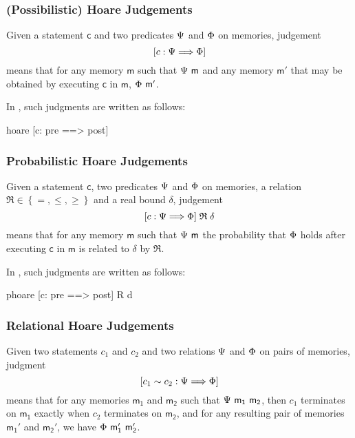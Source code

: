 
\subsubsection*{(Possibilistic) Hoare Judgements}
Given a statement $\mathsf{c}$ and two predicates $\Psi$ and $\Phi$ on
memories, judgement \[\left[{c}:{\Psi}\Longrightarrow{\Phi}\right]\] means that for any memory
$\mathsf{m}$ such that $\Psi\ \mathsf{m}$ and any memory $\mathsf{m'}$ that may
be obtained by executing $\mathsf{c}$ in $\mathsf{m}$, $\Phi\ \mathsf{m'}$.

In \EasyCrypt, such judgments are written as follows:
\begin{easycrypt}[frame=none]{}
hoare [c: pre ==> post]
\end{easycrypt}

\subsubsection*{Probabilistic Hoare Judgements}
Given a statement $\mathsf{c}$, two predicates $\Psi$ and $\Phi$ on
memories, a relation $\mathfrak{R} \in \left\{=,\leq,\geq\right\}$ and a real bound $\delta$,
judgement \[\left[{c}:{\Psi}\Longrightarrow{\Phi}\right] \mathrel{\mathfrak{R}} \delta\] means that for
any memory $\mathsf{m}$ such that $\Psi\ \mathsf{m}$ the probability that
$\Phi$ holds after executing $\mathsf{c}$ in $\mathsf{m}$ is related to
$\delta$ by $\mathfrak{R}$.

In \EasyCrypt, such judgments are written as follows:
\begin{easycrypt}[frame=none]{}
phoare [c: pre ==> post] R d
\end{easycrypt}

\subsubsection*{Relational Hoare Judgements}
Given two statements $c_1$ and $c_2$ and two relations $\Psi$
and $\Phi$ on pairs of memories, judgment
\[\left[{c_1}\sim{c_2}:{\Psi}\Longrightarrow{\Phi}\right]\]
means that for any memories $\mathsf{m_1}$ and $\mathsf{m_2}$ such that
$\pre\ \mathsf{m_1}\ \mathsf{m_2}$, then $c_1$ terminates on $\mathsf{m_1}$
exactly when $c_2$ terminates on $\mathsf{m_2}$, and for any resulting pair of
memories $\mathsf{m_1'}$ and $\mathsf{m_2'}$, we have
$\post\ \mathsf{m_1'}\ \mathsf{m_2'}$.

